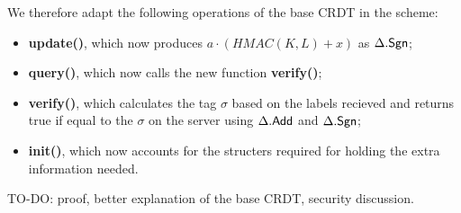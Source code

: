 \documentclass{article}
\begin{document}
We therefore adapt the following operations of the base CRDT in the scheme:
\begin{itemize}
    \item \textbf{update()}, which now produces $a\cdot (HMAC(K,L) + x)$ as $\Delta.\mathsf{Sgn}$;
    \item \textbf{query()}, which now calls the new function \textbf{verify()};
    \item \textbf{verify()}, which calculates the tag $\sigma$ based on the labels recieved and returns true if equal to the $\sigma$ on the server using $\Delta.\mathsf{Add}$ and $\Delta.\mathsf{Sgn}$;
    \item \textbf{init()}, which now accounts for the structers required for holding the extra information needed.
\end{itemize}


TO-DO: proof, better explanation of the base CRDT, security discussion.
\end{document}
